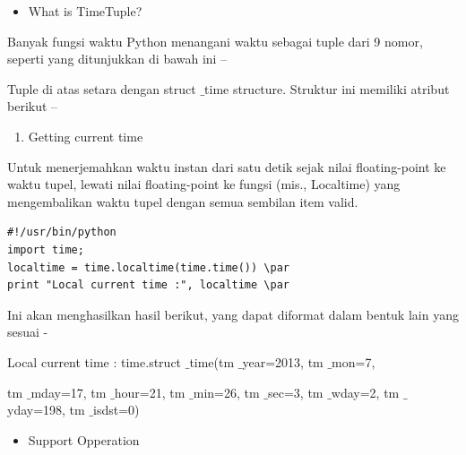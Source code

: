 \vspace{\baselineskip}
\noindent 
\begin{itemize}
	\item What is TimeTuple?
\end{itemize}
\noindent 
Banyak fungsi waktu Python menangani waktu sebagai tuple dari 9 nomor, seperti yang ditunjukkan di bawah ini – \par
\vspace{12pt}
\noindent 
Tuple di atas setara dengan struct $  \_  $time structure. Struktur ini memiliki atribut berikut – \par
\vspace{12pt}
\noindent 
\begin{enumerate}
	\item Getting current time
\end{enumerate}
\noindent 
Untuk menerjemahkan waktu instan dari satu detik sejak nilai floating-point ke waktu tupel, lewati nilai floating-point ke fungsi (mis., Localtime) yang mengembalikan waktu tupel dengan semua sembilan item valid. \par
 
 \begin{verbatim}
#!/usr/bin/python
import time; 
localtime = time.localtime(time.time()) \par
print "Local current time :", localtime \par
 \end{verbatim}
Ini akan menghasilkan hasil berikut, yang dapat diformat dalam bentuk lain yang sesuai - \par
\noindent 
Local current time : time.struct $  \_  $time(tm $  \_  $year=2013, tm $  \_  $mon=7,  \par
\noindent 
tm $  \_  $mday=17, tm $  \_  $hour=21, tm $  \_  $min=26, tm $  \_  $sec=3, tm $  \_  $wday=2, tm $  \_  $yday=198, tm $  \_  $isdst=0) \par
\vspace{12pt}
\vspace{12pt}
\vspace{12pt}
\vspace{12pt}
\vspace{12pt}
\vspace{12pt}
\vspace{12pt}
\vspace{12pt}

\begin{itemize}
	\item Support Opperation
\end{itemize}

